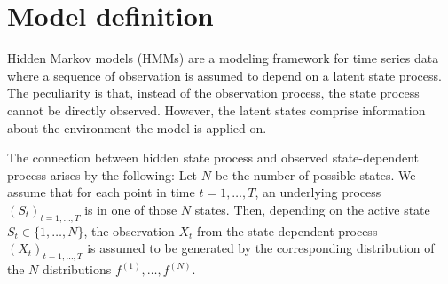 \documentclass[article]{jss}
\begin{document}

\section{Model definition} \label{sec:model_definition} %

Hidden Markov models (HMMs) are a modeling framework for time series data where a sequence of observation is assumed to depend on a latent state process. The peculiarity is that, instead of the observation process, the state process cannot be directly observed. However, the latent states comprise information about the environment the model is applied on. 

The connection between hidden state process and observed state-dependent process arises by the following: Let $N$ be the number of possible states. We assume that for each point in time $t = 1, \ldots, T$, an underlying process $(S_t)_{t = 1, \ldots, T}$ is in one of those $N$ states. Then, depending on the active state $S_t \in \{ 1, \ldots, N \}$, the observation $X_t$ from the state-dependent process $(X_t)_{t = 1, \ldots, T}$ is assumed to be generated by the corresponding distribution of the $N$ distributions $f^{(1)},\dots,f^{(N)}.$
\end{document}
